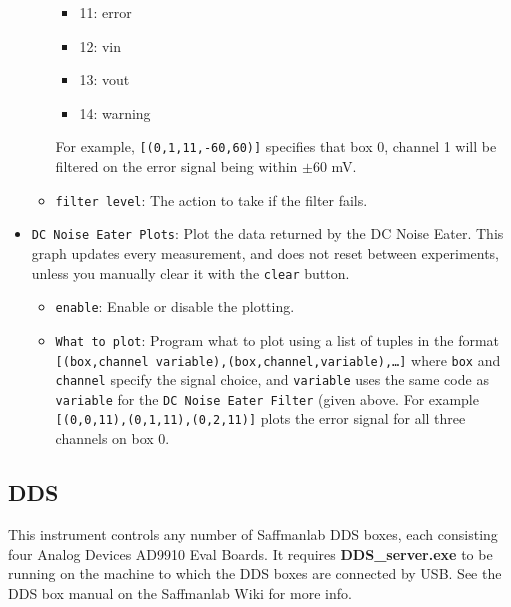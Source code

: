\documentclass[pdftex,11pt,letterpaper]{article}
\begin{document}
\begin{itemize}
\begin{itemize}
\begin{itemize}
\item 11: error
\item 12: vin
\item 13: vout
\item 14: warning
\end{itemize}
For example, \texttt{[(0,1,11,-60,60)]} specifies that box 0, channel 1 will be filtered on the error signal being within $\pm 60$ mV.
\item \texttt{filter level}:  The action to take if the filter fails.
\end{itemize}
\item \texttt{DC Noise Eater Plots}:  Plot the data returned by the DC Noise Eater.  This graph updates every measurement, and does not reset between experiments, unless you manually clear it with the \texttt{clear} button.
\begin{itemize}
\item \texttt{enable}:  Enable or disable the plotting.
\item \texttt{What to plot}:  Program what to plot using a list of tuples in the format \texttt{[(box,channel variable),(box,channel,variable),\dots]} where \texttt{box} and \texttt{channel} specify the signal choice, and \texttt{variable} uses the same code as \texttt{variable} for the \texttt{DC Noise Eater Filter} (given above.  For example \texttt{[(0,0,11),(0,1,11),(0,2,11)]} plots the error signal for all three channels on box 0.
\end{itemize}
\end{itemize}

\subsection{DDS}

This instrument controls any number of Saffmanlab DDS boxes, each consisting four Analog Devices AD9910 Eval Boards.  It requires \textbf{DDS\_server.exe} to be running on the machine to which the DDS boxes are connected by USB.  See the DDS box manual on the Saffmanlab Wiki for more info.
\end{document}
